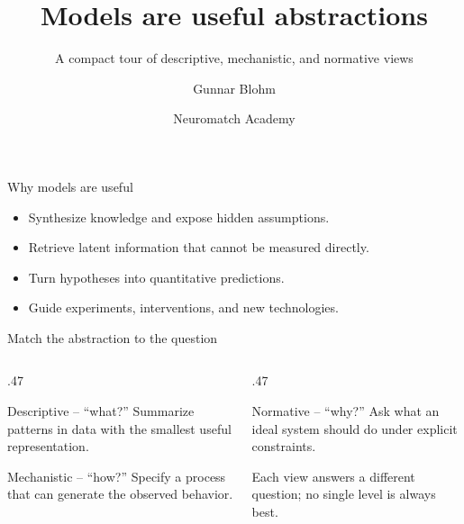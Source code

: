 \documentclass[aspectratio=169,10pt]{beamer}
\title[Models]{Models are useful abstractions}
\subtitle{A compact tour of descriptive, mechanistic, and normative views}
\author[Gunnar Blohm]{Gunnar Blohm}
\date{Neuromatch Academy}
\begin{document}
\begin{frame}[plain]
  \titlepage
\end{frame}

\begin{frame}{Why models are useful}
  \begin{itemize}
    \item Synthesize knowledge and expose hidden assumptions.
    \item Retrieve latent information that cannot be measured directly.
    \item Turn hypotheses into quantitative predictions.
    \item Guide experiments, interventions, and new technologies.
  \end{itemize}

  \end{frame}

\begin{frame}{Match the abstraction to the question}
  \begin{columns}[T,onlytextwidth]
    \begin{column}{.47\textwidth}
      \begin{block}{Descriptive -- ``what?''}
        Summarize patterns in data with the smallest useful representation.
      \end{block}
      \vspace{.35em}
      \begin{exampleblock}{Mechanistic -- ``how?''}
        Specify a process that can generate the observed behavior.
      \end{exampleblock}
    \end{column}
    \begin{column}{.47\textwidth}
      \begin{alertblock}{Normative -- ``why?''}
        Ask what an ideal system should do under explicit constraints.
      \end{alertblock}
      \vspace{.35em}
      Each view answers a different question; no single level is always best.
    \end{column}
  \end{columns}
\end{frame}
\end{document}

